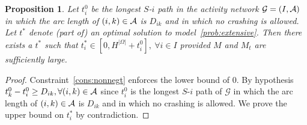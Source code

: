 \documentclass[11pt]{article}
\newtheorem{proposition}[theorem]{Proposition}
\newcommand{\cA}{{\cal A}}
\begin{document}
	{
	\begin{proposition} \label{prop:bounds}
		 Let \(t_i^0\) be the longest \(S\)-\(i\) path in the activity network \(\mathcal{G} = (I,\cA)\) in which the arc length of \((i,k) \in \cA\) is \(D_{ik}\) and in which no crashing is allowed. Let \(t^*\) denote (part of) an optimal solution to model~\eqref{prob:extensive}. Then there exists a \(t^*\) such that \(t^*_i \in [0,H^{|\Omega|} + t_i^0],\ \forall i \in I\) provided $M$ and $M_t$ are sufficiently large.
	\end{proposition}
	\begin{proof}
		Constraint~\eqref{cons:nonnegt} enforces the lower bound of $0$.
		By hypothesis \(t_k^0 - t_i^0 \geq D_{ik}, \forall (i,k) \in \cA\) since \(t_i^0\) is the longest \(S\)-\(i\) path of \(\mathcal{G}\) in which the arc length of \((i,k) \in \cA\) is \(D_{ik}\) and in which no crashing is allowed. We prove the upper bound on \(t_i^*\) by contradiction. 
		

\end{proof}}
\end{document}
